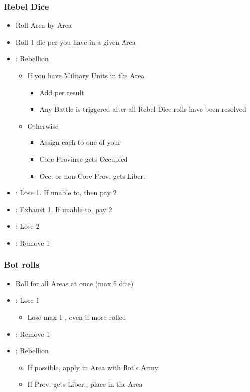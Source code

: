 \documentclass[10pt]{article}
\begin{document}
\subsubsection*{Rebel Dice}
\begin{itemize}
	\item Roll Area by Area
	\item Roll 1 die per \unrest you have in a given Area
	\item \rebellion: Rebellion
	\begin{itemize}
		\item If you have Military Units in the Area
		\begin{itemize}
			\item Add \rebels per \rebellion result
			\item Any Battle is triggered after all Rebel Dice rolls have been resolved
		\end{itemize}
		\item Otherwise
		\begin{itemize}
			\item Assign each \rebellion to one of your \unrest
			\item Core Province gets Occupied
			\item Occ. or non-Core Prov. gets Liber.
		\end{itemize}
	\end{itemize}
	\item \losemonarchpower: Lose 1\monarchpower. If unable to, then pay 2\ducats
	\item \exhaustunits: Exhaust 1\manpower. If unable to, pay 2\ducats
	\item \loseducats: Lose 2\ducats
	\item \removeunrest: Remove 1 \unrest
\end{itemize}

\subsubsection*{\botrules Bot rolls }
{\botrules
\begin{itemize}
	\item Roll for all Areas at once (max 5 dice)
	\item \loseducats \exhaustunits \losemonarchpower: Lose 1 \botpower
	\begin{itemize}
		\item Lose max 1 \botpower, even if more rolled
	\end{itemize}
	\item \removeunrest: Remove 1 \unrest
	\item \rebellion: Rebellion
	\begin{itemize}
		\item If possible, apply in Area with Bot's Army
		\item If Prov. gets Liber., place \claim in the Area
	\end{itemize}
\end{itemize}
}
\end{document}
